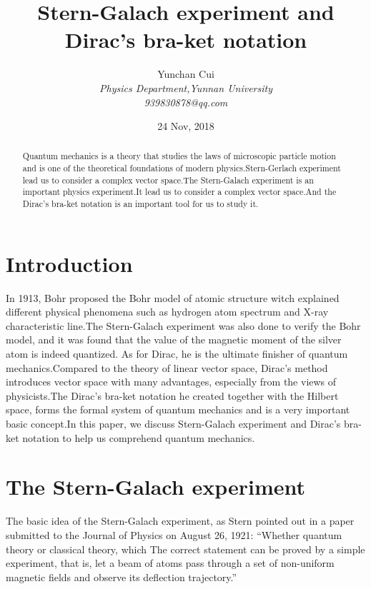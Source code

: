 \documentclass[a4paper]{article}
\begin{document}

\title{  Stern-Galach experiment and Dirac's bra-ket notation }
\author{Yunchan Cui\\\emph{Physics Department,Yunnan University}\\\emph{939830878@qq.com}}
\date{24 Nov, 2018}
\maketitle

\begin{abstract}
Quantum mechanics is a theory that studies the laws of microscopic particle motion and is one of the theoretical foundations of modern physics.Stern-Gerlach experiment lead us to consider a complex vector space.The Stern-Galach experiment is an important physics experiment.It lead us to consider a complex vector space.And the Dirac's bra-ket notation is an important tool for us to study it.
\end{abstract}

\section{Introduction}
    In 1913, Bohr proposed the Bohr model of atomic structure witch explained different physical phenomena such as hydrogen atom spectrum and X-ray characteristic line.The Stern-Galach experiment was also done to verify the Bohr model, and it was found that the value of the magnetic moment of the silver atom is indeed quantized. As for Dirac, he is the ultimate finisher of quantum mechanics.Compared to the theory of linear vector space, Dirac's method introduces vector space with many advantages, especially from the views of physicists.The Dirac's bra-ket notation he created together with the Hilbert space, forms the formal system of quantum mechanics and is a very important basic concept.In this paper, we discuss Stern-Galach experiment and Dirac's bra-ket notation to help us comprehend quantum mechanics.

\section{The Stern-Galach experiment}
    The basic idea of the Stern-Galach experiment, as Stern pointed out in a paper submitted to the Journal of Physics on August 26, 1921: ``Whether quantum theory or classical theory, which The correct statement can be proved by a simple experiment, that is, let a beam of atoms pass through a set of non-uniform magnetic fields and observe its deflection trajectory.''
\end{document}
